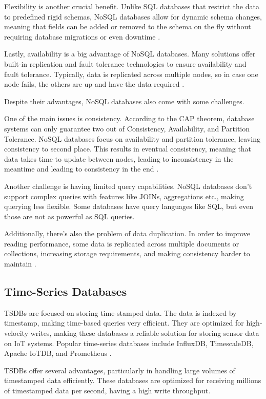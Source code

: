 Flexibility is another crucial benefit.
Unlike \gls{SQL} databases that restrict the data to predefined rigid schemas,
\gls{NoSQL} databases allow for dynamic schema changes, meaning that fields can
be added or removed to the schema on the fly without requiring database
migrations or even downtime \cite{Yadav2024}.

Lastly, availability is a big advantage of \gls{NoSQL} databases.
Many solutions offer built-in replication and fault tolerance
technologies to ensure availability and fault tolerance. Typically, data is
replicated across multiple nodes, so in case one node fails, the others
are up and have the data required \cite{Yadav2024}.

Despite their advantages, \gls{NoSQL} databases also come with some challenges.

One of the main issues is consistency.
According to the \gls{CAP} theorem, database systems can only guarantee two out of
Consistency, Availability, and Partition Tolerance. \gls{NoSQL} databases focus on
availability and partition tolerance, leaving consistency to second place.
This results in eventual consistency, meaning that data takes time to update
between nodes, leading to inconsistency in the meantime and leading to
consistency in the end \cite{Yadav2024}.

Another challenge is having limited query capabilities.
\gls{NoSQL} databases don't support complex queries with features like JOINs,
aggregations etc., making querying less flexible. Some databases have query
languages like \gls{SQL}, but even those are not as powerful as \gls{SQL} queries.

Additionally, there's also the problem of data duplication.
In order to improve reading performance, some data is replicated across
multiple documents or collections, increasing storage requirements, and
making consistency harder to maintain \cite{bdcc7020097}.
\subsection{Time-Series Databases}
\gls{TSDB}s are focused on storing time-stamped data. The
data is indexed by timestamp, making time-based queries very efficient. They are
optimized for high-velocity writes, making these databases a reliable solution
for storing sensor data on \gls{IoT} systems. Popular time-series databases include
InfluxDB, TimescaleDB, Apache IoTDB, and Prometheus \cite{wang2023apache, InfluxDB}.

\gls{TSDB}s offer several advantages, particularly in handling large volumes
of timestamped data efficiently. These databases are optimized for receiving
millions of timestamped data per second, having a high write throughput.

